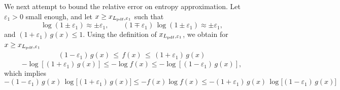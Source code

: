\documentclass{article}
\theoremstyle{definition}
\begin{document}
We next attempt to bound the relative error on entropy approximation. Let $\varepsilon_1 > 0$ small enough, and let \(x\ge x_{L_{\rm pdf},\varepsilon_1}\) such that 
\[
\log(1\pm\varepsilon_1) \approx \pm\varepsilon_1,
\qquad
(1\mp\varepsilon_1)\,\log(1\pm\varepsilon_1) \approx \pm\varepsilon_1,
\]
and \((1+\varepsilon_1)\,g(x)\le 1\). Using the definition of \(x_{L_{\rm pdf},\varepsilon_1}\), we obtain for \(x\ge x_{L_{\rm pdf},\varepsilon_1}\)
\begin{align*}
(1-\varepsilon_1)\,g(x) \,\le \, f(x) \,\le\,(1+\varepsilon_1)\,g(x) 
\end{align*}
\[
-\log{[(1 + \varepsilon_1)\,g(x)]} \le -\log f(x) \le - \log{[(1 - \varepsilon_1)\,g(x)]},
\]
which implies
\[
-(1 - \varepsilon_1)\,g(x)\,
\log\bigl[(1 + \varepsilon_1)\,g(x)\bigr]
\leq - f(x) \log f(x)
\leq - (1 + \varepsilon_1)\,g(x)\,
\log\bigl[(1 - \varepsilon_1)\,g(x)\bigr]
\]
\end{document}
